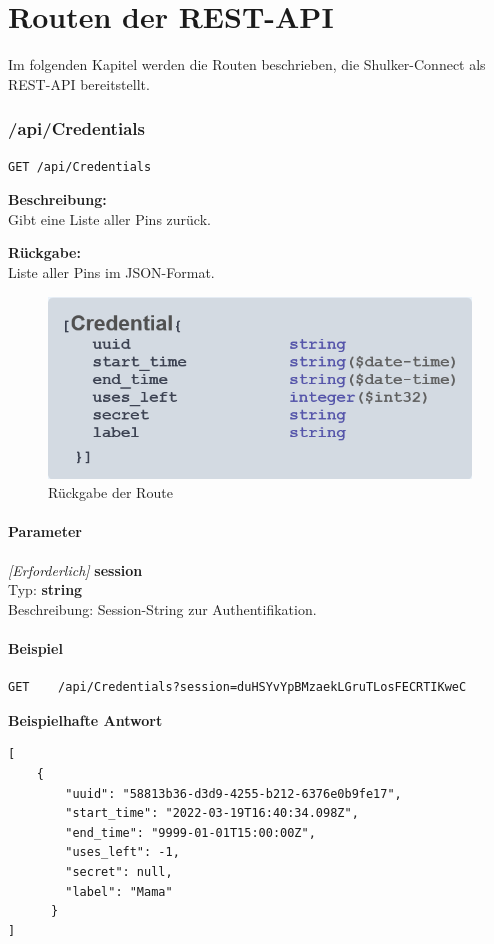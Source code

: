 \lstset{language=json}
\chapter{Routen der REST-API}
Im folgenden Kapitel werden die Routen beschrieben, die Shulker-Connect als REST-API bereitstellt.

\subsection{/api/Credentials}
\begin{lstlisting}
GET /api/Credentials
\end{lstlisting}

\textbf{Beschreibung:} \\
Gibt eine Liste aller Pins zurück.

\textbf{Rückgabe:} \\
Liste aller Pins im JSON-Format.

\begin{figure}[H]
    \begin{center}
        \includegraphics[width=.5\textwidth]{images/connect/routes/Credentials.png}
        \caption{Rückgabe der Route}
    \end{center}
\end{figure}

\subsubsection{Parameter}
\textit{[Erforderlich]} \textbf{session} \\
Typ: \textbf{string} \\
Beschreibung: Session-String zur Authentifikation.

\subsubsection{Beispiel}
\begin{lstlisting}
GET    /api/Credentials?session=duHSYvYpBMzaekLGruTLosFECRTIKweC
\end{lstlisting}
\textbf{Beispielhafte Antwort} \\
\begin{lstlisting}
[
    {
        "uuid": "58813b36-d3d9-4255-b212-6376e0b9fe17",
        "start_time": "2022-03-19T16:40:34.098Z",
        "end_time": "9999-01-01T15:00:00Z",
        "uses_left": -1,
        "secret": null,
        "label": "Mama"
      }
]
\end{lstlisting}







